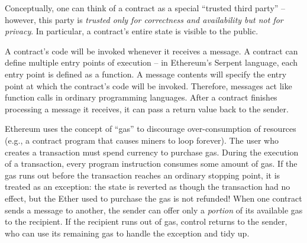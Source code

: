 \documentclass{llncs}
\renewcommand{\paragraph}[1]{\vspace{5pt} \noindent{\bf #1}}
\begin{document}


Conceptually, one can think of a contract as 
a special ``trusted third party'' -- however,
this party is {\it trusted only for correctness and availability but not for privacy}.
In particular, a contract's entire state is 
visible to the public.

\paragraph{Contract invocation.} 
A contract's code will be invoked 
whenever it receives a message.
A contract can define multiple entry points
of execution -- in Ethereum's Serpent language,
each entry point is defined as a function.
A message contents
will specify the entry point 
at which the contract's code will be invoked.
Therefore, messages act like function calls in ordinary programming languages. 
After a contract finishes processing a message it receives, it can pass a return value back to the sender.







\paragraph{Gas.}
Ethereum uses 
the concept of ``gas'' to discourage over-consumption of resources (e.g.,
a contract program that causes miners to loop forever). The user who creates a transaction must spend currency to purchase gas. During the execution of a transaction, every program instruction consumes some amount of gas. If the gas runs out before the transaction reaches an ordinary stopping point, it is treated as an exception: the state is reverted as though the transaction had no effect, but the Ether used to purchase the gas is not refunded! When one contract sends a message to another, the sender can offer only a \emph{portion} of its available gas to the recipient. If the recipient runs out of gas, control returns to the sender, who can use its remaining gas to handle the exception and tidy up.
\end{document}
